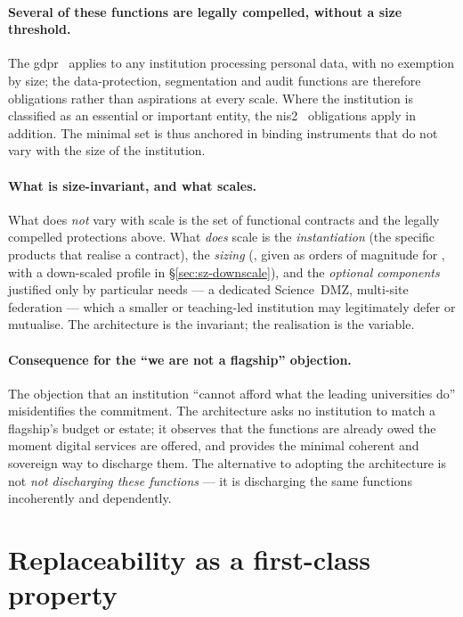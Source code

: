 \paragraph{Several of these functions are legally compelled, without a
size threshold.} The \gls{gdpr}~\cite{gdpr} applies to any institution
processing personal data, with no exemption by size; the
data-protection, segmentation and audit functions are therefore
obligations rather than aspirations at every scale. Where the
institution is classified as an essential or important entity, the
\gls{nis2}~\cite{nis2} obligations apply in addition. The minimal set
is thus anchored in binding instruments that do not vary with the size
of the institution.

\paragraph{What is size-invariant, and what scales.} What does
\emph{not} vary with scale is the set of functional contracts and the
legally compelled protections above. What \emph{does} scale is the
\emph{instantiation} (the specific products that realise a contract),
the \emph{sizing} (, given as orders of magnitude
for , with a down-scaled profile in
\S\ref{sec:sz-downscale}), and the \emph{optional components} justified
only by particular needs --- a dedicated Science~DMZ, multi-site
federation --- which a smaller or teaching-led institution may
legitimately defer or mutualise. The architecture is the invariant;
the realisation is the variable.

\paragraph{Consequence for the ``we are not a flagship'' objection.}
The objection that an institution ``cannot afford what the leading
universities do'' misidentifies the commitment. The architecture asks
no institution to match a flagship's budget or estate; it observes
that the functions are already owed the moment digital services are
offered, and provides the minimal coherent and sovereign way to
discharge them. The alternative to adopting the architecture is not
\emph{not discharging these functions} --- it is discharging the same
functions incoherently and dependently.

\section{Replaceability as a first-class property}
\label{sec:ap-replaceability}

